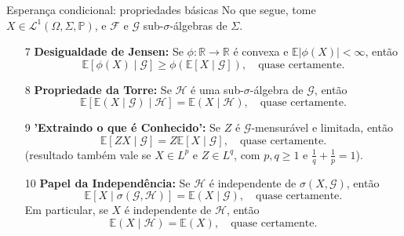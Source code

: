 \documentclass[11pt]{beamer}
\begin{document}
	
		\begin{frame}{Esperança condicional: propriedades básicas}
		\footnotesize 
		No que segue, tome $X \in \mathcal{L}^1(\Omega,\Sigma,\mathbb{P})$, e $\mathcal{F}$ e $\mathcal{G}$ sub-$\sigma$-álgebras de $\Sigma$.
		\begin{lemma}
			\begin{enumerate}
					\item[7] \textbf{Desigualdade de Jensen:}  
				Se \( \phi: \mathbb{R} \to \mathbb{R} \) é convexa e \( \mathbb{E}|\phi(X)| < \infty \), então
				\[
				\mathbb{E}[\phi(X) \mid \mathcal{G}] \geq \phi(\mathbb{E}[X \mid \mathcal{G}]), \quad \text{quase certamente.}
				\]
			\item[8] \textbf{Propriedade da Torre:}  
			Se \( \mathcal{H} \) é uma sub-\(\sigma\)-álgebra de \( \mathcal{G} \), então
			\[
			\mathbb{E}[\mathbb{E}(X \mid \mathcal{G}) \mid \mathcal{H}] = \mathbb{E}(X \mid \mathcal{H}), \quad \text{quase certamente}.
			\]
			
			\item[9] \textbf{'Extraindo o que é Conhecido':}  
			Se \( Z \) é \( \mathcal{G} \)-mensurável e limitada, então
			\[
			\mathbb{E}[ZX \mid \mathcal{G}] = Z \mathbb{E}[X \mid \mathcal{G}], \quad \text{quase certamente}.
			\]
				(resultado também vale se $X\in L^p$ e $Z \in L^q$, com $p,q\geq1$ e $\frac{1}{q}  +\frac{1}{p} =1$).
			
			\item[10] \textbf{Papel da Independência:}  
			Se \( \mathcal{H} \) é independente de \( \sigma(X, \mathcal{G}) \), então
			\[
			\mathbb{E}[X \mid \sigma(\mathcal{G}, \mathcal{H})] = \mathbb{E}(X \mid \mathcal{G}), \quad \text{quase certamente}.
			\]
			Em particular, se \( X \) é independente de \( \mathcal{H} \), então
			\[
			\mathbb{E}(X \mid \mathcal{H}) = \mathbb{E}(X), \quad \text{quase certamente}.
			\]
			\end{enumerate}
		\end{lemma}
		
		
		
	\end{frame}
	
\end{document}
